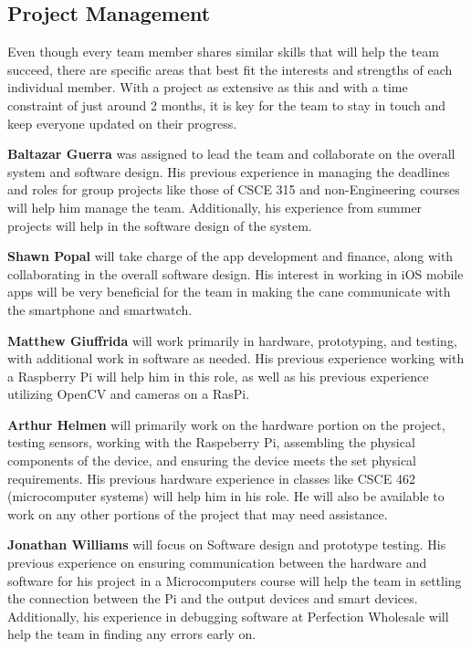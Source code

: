 \documentclass[letterpaper,12pt]{article}
\begin{document}
\subsection{Project Management}
Even though every team member shares similar skills that will help the team succeed, there are specific areas that best fit the interests and strengths of each individual member. With a project as extensive as this and with a time constraint of just around 2 months, it is key for the team to stay in touch and keep everyone updated on their progress. \par

\textbf{Baltazar Guerra} was assigned to lead the team and collaborate on the overall system and software design. His previous experience in managing the deadlines and roles for group projects like those of CSCE 315 and non-Engineering courses will help him manage the team. Additionally, his experience from summer projects will help in the software design of the system. \par

\textbf{Shawn Popal} will take charge of the app development and finance, along with collaborating in the overall software design. His interest in working in iOS mobile apps will be very beneficial for the team in making the cane communicate with the smartphone and smartwatch.

\textbf{Matthew Giuffrida} will work primarily in hardware, prototyping, and testing, with additional work in software as needed. His previous experience working with a Raspberry Pi will help him in this role, as well as his previous experience utilizing OpenCV and cameras on a RasPi. \par

\textbf{Arthur Helmen} will primarily work on the hardware portion on the project, testing sensors, working with the Raspeberry Pi,  assembling the physical components of the device, and ensuring the device meets the set physical requirements. His previous hardware experience in classes like CSCE 462 (microcomputer systems) will help him in his role. He will also be available to work on any other portions of the project that may need assistance. \par

\textbf{Jonathan Williams} will focus on Software design and prototype testing. His previous experience on ensuring communication between the hardware and software for his project in a Microcomputers course will help the team in settling the connection between the Pi and the output devices and smart devices. Additionally, his experience in debugging software at Perfection Wholesale will help the team in finding any errors early on.
\end{document}
